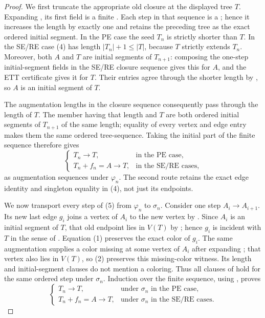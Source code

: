 \begin{proof}
We first truncate the appropriate old closure at the displayed tree
$T$.  Expanding , its first field is a finite
.  Each step in that sequence is
a ; hence it increases the length by
exactly one and retains the preceding tree as the exact ordered initial
segment.  In the PE case the seed $T_n$ is strictly shorter than $T$.
In the SE/RE case (4) has length $|T_n|+1\leq |T|$, because $T$ strictly
extends $T_n$.  Moreover, both $A$ and $T$ are initial segments of
$T_{n+1}$: composing the one-step initial-segment fields in the SE/RE
closure sequence gives this for $A$, and the ETT certificate gives it for
$T$.  Their entries agree through the shorter length by
, so $A$ is an initial segment of
$T$.

The augmentation lengths in the closure sequence consequently pass
through the length of $T$.  The member having that length and $T$ are
both ordered initial segments of $T_{n+1}$ of the same length; equality
of every vertex and edge entry makes them the same ordered tree-sequence.
Taking the initial part of the finite sequence therefore gives
\[
 \begin{cases}
  T_n\longrightarrow T,&\text{in the PE case},\\
  T_n+f_n=A\longrightarrow T,&\text{in the SE/RE cases},
 \end{cases}                                                   \tag{5}
\]
as augmentation sequences under $\varphi_n$.  The second route retains
the exact edge identity and singleton equality in (4), not just its
endpoints.

We now transport every step of (5) from $\varphi_n$ to $\sigma_n$.
Consider one step $A_i\to A_{i+1}$.  Its new last edge $g_i$ joins a
vertex of $A_i$ to the new vertex by
.  Since $A_i$ is an initial segment of
$T$, that old endpoint lies in $V(T)$ by
; hence $g_i$ is incident with $T$ in the
sense of .  Equation (1) preserves the exact
color of $g_i$.  The same augmentation supplies a color missing at some
vertex of $A_i$ after expanding ; that vertex
also lies in $V(T)$, so (2) preserves this missing-color witness.  Its
length and initial-segment clauses do not mention a coloring.  Thus all
clauses of
 hold for the same ordered step under
$\sigma_n$.  Induction over the finite sequence, using
, proves
\[
 \begin{cases}
  T_n\longrightarrow T,&\text{under $\sigma_n$ in the PE case},\\
  T_n+f_n=A\longrightarrow T,&\text{under $\sigma_n$ in the SE/RE cases}.
 \end{cases}                                                   \tag{6}
\]


\end{proof}
